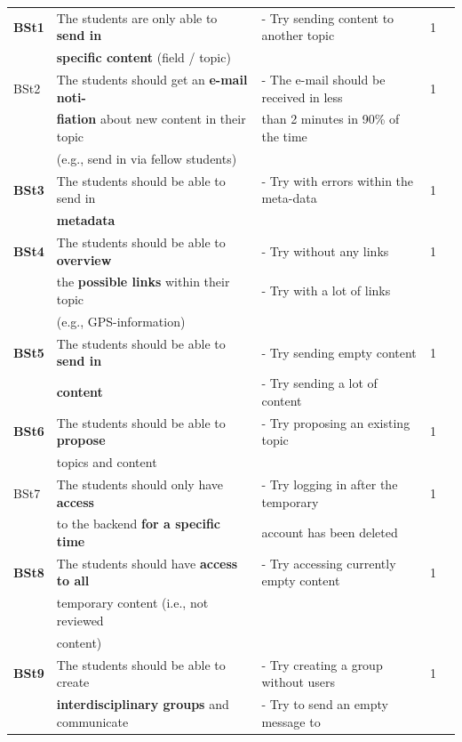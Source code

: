 {\begin{landscape}
\begin{center}
\begin{longtable}{|l|l|lll|}
\hline \hline
\endlastfoot
		\hline
	\textbf{BSt1} & The students are only able to \textbf{send in} 		& - Try sending content to another topic & 1	\\
	 	& \textbf{specific content} (field / topic) 				&  & 		\\
	\hline
	BSt2	& The students should get an \textbf{e-mail noti-} 	& - The e-mail should be received in less & 1	\\
	 	& \textbf{fiation} about new content in their topic 	& than 2 minutes in 90\% of the time & 	\\
	 	& (e.g., send in via fellow students) 			&  & 	\\
	\hline
	\textbf{BSt3} & The students should be able to send in  		& - Try with errors within the meta-data & 1\\
	 	& \textbf{metadata} 							&  & \\
	\hline
	\textbf{BSt4} & The students should be able to \textbf{overview} 	& - Try without any links & 1\\
	 	& the \textbf{possible links} within their topic 			& - Try with a lot of links & \\
	 	& (e.g., GPS-information) 						&  & \\
	\hline
	\textbf{BSt5} & The students should be able to \textbf{send in}  		& - Try sending empty content  & 1\\
	 	& \textbf{content}								& - Try sending a lot of content  & \\
	\hline
	\textbf{BSt6} & The students should be able to \textbf{propose}  	& - Try proposing an existing topic  & 1\\
	 	& topics and content  				    			&  & \\
	\hline
	BSt7 & The students should only have \textbf{access}  		& - Try logging in after the temporary & 1\\
		& to the backend \textbf{for a specific time} 			& account has been deleted	& \\	
	\hline
	\textbf{BSt8} & The students should have \textbf{access to all} 		& - Try accessing currently empty content  	& 1\\
		& temporary content (i.e., not reviewed 				&	& \\
		&	content)									&	& \\
	\hline
	\textbf{BSt9} & The students should be able to create 			& - Try creating a group without users  	& 1\\
		& \textbf{interdisciplinary groups} and communicate	& - Try to send an empty message to	& \\

\end{longtable}
\end{center}
\end{landscape}}
